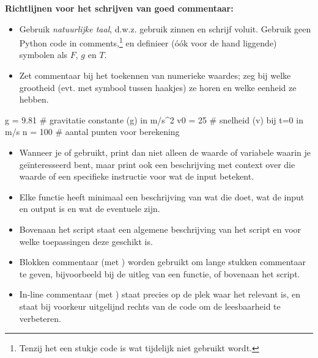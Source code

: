 \documentclass[a4paper,11pt, fleqn]{article}
\begin{document}
\textbf{Richtlijnen voor het schrijven van goed commentaar:}
\begin{itemize}
\item Gebruik \textit{natuurlijke taal}, d.w.z. gebruik zinnen en schrijf voluit. Gebruik geen Python code in comments,\footnote{Tenzij het een stukje code is wat tijdelijk niet gebruikt wordt.} en definieer (\'o\'ok voor de hand liggende) symbolen als $F$, $g$ en $T$.
\item Zet commentaar bij het toekennen van numerieke waardes; zeg bij welke grootheid (evt. met symbool tussen haakjes) ze horen en welke eenheid ze hebben.
\end{itemize}
	\begin{python}
	g = 9.81      # gravitatie constante (g) in m/s^2
	v0 = 25       # snelheid (v) bij t=0 in m/s
	n = 100       # aantal punten voor berekening
	\end{python}
\begin{itemize}
\item Wanneer je  of  gebruikt, print dan niet alleen de waarde of variabele waarin je ge\"interesseerd bent, maar print ook een beschrijving met context over die waarde of een specifieke instructie voor wat de input betekent.
\item Elke functie heeft minimaal een beschrijving van wat die doet, wat de input en output is en wat de eventuele  zijn.
\item Bovenaan het script staat een algemene beschrijving van het script en voor welke toepassingen deze geschikt is.
\item Blokken commentaar (met ) worden gebruikt om lange stukken commentaar te geven, bijvoorbeeld bij de uitleg van een functie, of bovenaan het script.
\item In-line commentaar (met ) staat precies op de plek waar het relevant is, en staat bij voorkeur uitgelijnd rechts van de code om de leesbaarheid te verbeteren.
\end{itemize}
\end{document}
